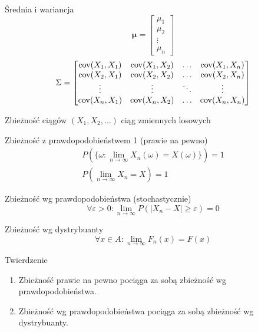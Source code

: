 \documentclass{mp}
\subtitle{Ciągi zmiennych losowych}
\begin{document}
\frame{\titlepage}
\begin{frame}{Średnia i wariancja}
\[ \bm{\mu}=\begin{bmatrix} \mu_1 \\ \mu_2 \\ \vdots \\ \mu_n \end{bmatrix} \]
\[ \Sigma=\begin{bmatrix}
\operatorname{cov}(X_1,X_1) & \operatorname{cov}(X_1,X_2) & \ldots & \operatorname{cov}(X_1,X_n) \\
\operatorname{cov}(X_2,X_1) & \operatorname{cov}(X_2,X_2) & \ldots & \operatorname{cov}(X_2,X_n) \\
\vdots & \vdots & \ddots & \vdots \\
\operatorname{cov}(X_n,X_1) & \operatorname{cov}(X_n,X_2) & \ldots & \operatorname{cov}(X_n,X_n) \\
\end{bmatrix} \]
\end{frame}
\begin{frame}{Zbieżność ciągów}
$(X_1,X_2,\ldots)$ ciąg zmiennych losowych
\only<+>
{
\begin{block}{Zbieżność z prawdopodobieństwem 1 (prawie na pewno)}
\begin{gather*}
P(\{\omega\colon \lim_{n\to\infty}X_n(\omega)=X(\omega)\})=1 \\
P(\lim_{n\to\infty} X_n=X)=1
\end{gather*}
\end{block}
}
\only<+>
{
\begin{block}{Zbieżność wg prawdopodobieństwa (stochastycznie)}
\[\forall\varepsilon>0\colon \lim_{n\to\infty}P(\left|X_n-X\right|\geq\varepsilon)=0\]
\end{block}
}
\only<+>
{
\begin{block}{Zbieżność wg dystrybuanty}
\[\forall x\in A\colon \lim_{n\to\infty} F_n(x) =F(x) \]
\end{block}
}
\only<+>
{
	\begin{block}{Twierdzenie}
	\begin{enumerate}
	\item Zbieżność prawie na pewno pociąga za sobą zbieżność wg prawdopodobieństwa.
	\item Zbieżność wg prawdopodobieństwa pociąga za sobą zbieżność wg dystrybuanty.
	\end{enumerate}
	\end{block}
}
\end{frame}
\end{document}
